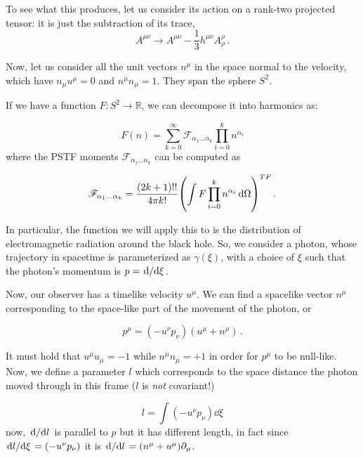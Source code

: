 \documentclass[main.tex]{subfiles}
\begin{document}
To see what this produces, let us consider its action on a rank-two projected tensor: it is just the subtraction of its trace,
\begin{equation}
    A^{\mu\nu} \rightarrow A^{\mu\nu} - \frac{1}{3} h^{\mu\nu} A^{\rho}_\rho \,.
\end{equation}

Now, let us consider all the unit vectors \(n^\mu\) in the space normal to the velocity, which have \(n_\mu u^\mu = 0\) and \(n^\mu n_\mu = 1\). They span the sphere \(S^2\).

If we have a function \(F\colon S^2 \rightarrow \mathbb R\), we can decompose it into harmonics as:

\begin{equation}
    F(n) = \sum _{k=0}   ^{\infty}
    \mathscr F_{\alpha_1 \dots \alpha_k} \prod_{i=0}^k n^{\alpha_i}
\end{equation}
where the PSTF moments \(\mathscr F_{\alpha_1 \dots \alpha_k}\) can be computed as

\begin{equation} \label{eq:PSTF-moments-function-decomposition}
    \mathscr F_{\alpha_1 \dots \alpha_k} =
    \frac{(2k+1)!!}{4 \pi k!} \qty(\int F \prod_{i=0}^k n^{\alpha_i}  \dd{\Omega}  )^{TF} \,.
\end{equation}

In particular, the function we will apply this to is the distribution of electromagnetic radiation around the black hole. So, we consider a photon, whose trajectory in spacetime is parameterized as \(\gamma(\xi)\), with a choice of \(\xi\) such that the photon's momentum is
\(
p = \dv*{}{\xi}
\).

Now, our observer has a timelike velocity \(u^\mu\). We can find a spacelike vector \(n^\mu\) corresponding to the space-like part of the movement of the photon, or

\begin{equation}
  p^\mu = (- u^\nu p_\nu) (u^\mu + n^\mu)\,.
\end{equation}

It must hold that \(u^\mu u_\mu = -1 \) while \(n^\mu n_\mu = +1 \) in order for \(p^\mu\) to be null-like.
Now, we define a parameter \(l\) which corresponds to the space distance the photon moved through in this frame (\(l\)  is \emph{not} covariant!)

\begin{equation}
    l = \int  (-u^\nu p_\nu) \dd{\xi}
\end{equation}
now, \(\dv*{}{l} \) is parallel to \(p\) but it has different length, in fact since \(\dv*{l}{\xi} = (-u^\nu p_\nu) \) it is \(\dv*{}{l} = (n^\mu + u^\mu) \partial_\mu\).
\end{document}
